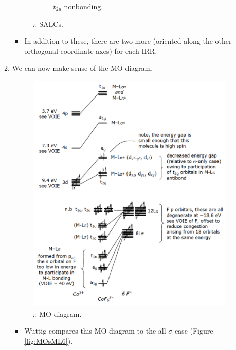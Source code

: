 \documentclass[../notes.tex]{subfiles}
\begin{document}
\begin{itemize}
\begin{enumerate}
\begin{figure}[H]
\begin{subfigure}[b]{0.24\linewidth}
                \caption{$t_{2u}$ nonbonding.}
                \label{fig:SALCML6pid}
            \end{subfigure}
            \caption{ $\pi$ SALCs.}
            \label{fig:SALCML6pi}
        \end{figure}
        \begin{itemize}
            \item In addition to these, there are two more (oriented along the other orthogonal coordinate axes) for each IRR.
        \end{itemize}
        \item We can now make sense of the MO diagram.
        \begin{figure}[h!]
            \centering
            \includegraphics[width=0.6\linewidth]{../ExtFiles/MOsML6pi.png}
            \caption{ $\pi$ MO diagram.}
            \label{fig:MOsML6pi}
        \end{figure}
        \begin{itemize}
            \item Wuttig compares this MO diagram to the all-$\sigma$ case (Figure \ref{fig:MOsML6}).

\end{itemize}
\end{enumerate}
\end{itemize}
\end{document}
